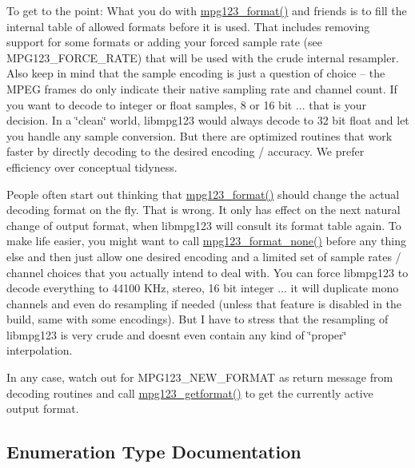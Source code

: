 To get to the point\+: What you do with \mbox{\hyperlink{group__mpg123__output_gadad5794afc300a997e517dbe397dc2c7}{mpg123\+\_\+format()}} and friends is to fill the internal table of allowed formats before it is used. That includes removing support for some formats or adding your forced sample rate (see M\+P\+G123\+\_\+\+F\+O\+R\+C\+E\+\_\+\+R\+A\+TE) that will be used with the crude internal resampler. Also keep in mind that the sample encoding is just a question of choice -- the M\+P\+EG frames do only indicate their native sampling rate and channel count. If you want to decode to integer or float samples, 8 or 16 bit ... that is your decision. In a \char`\"{}clean\char`\"{} world, libmpg123 would always decode to 32 bit float and let you handle any sample conversion. But there are optimized routines that work faster by directly decoding to the desired encoding / accuracy. We prefer efficiency over conceptual tidyness.

People often start out thinking that \mbox{\hyperlink{group__mpg123__output_gadad5794afc300a997e517dbe397dc2c7}{mpg123\+\_\+format()}} should change the actual decoding format on the fly. That is wrong. It only has effect on the next natural change of output format, when libmpg123 will consult its format table again. To make life easier, you might want to call \mbox{\hyperlink{group__mpg123__output_ga931ca238347de394901c3baa13e7a8f8}{mpg123\+\_\+format\+\_\+none()}} before any thing else and then just allow one desired encoding and a limited set of sample rates / channel choices that you actually intend to deal with. You can force libmpg123 to decode everything to 44100 K\+Hz, stereo, 16 bit integer ... it will duplicate mono channels and even do resampling if needed (unless that feature is disabled in the build, same with some encodings). But I have to stress that the resampling of libmpg123 is very crude and doesn\textquotesingle{}t even contain any kind of \char`\"{}proper\char`\"{} interpolation.

In any case, watch out for M\+P\+G123\+\_\+\+N\+E\+W\+\_\+\+F\+O\+R\+M\+AT as return message from decoding routines and call \mbox{\hyperlink{group__mpg123__output_gae5e04c7522d620e122009db359cc6dc5}{mpg123\+\_\+getformat()}} to get the currently active output format. 

\subsection{Enumeration Type Documentation}
\mbox{\label{group__mpg123__output_ga94df916cae2fc81b8a6df88c1728eb1c}} 
